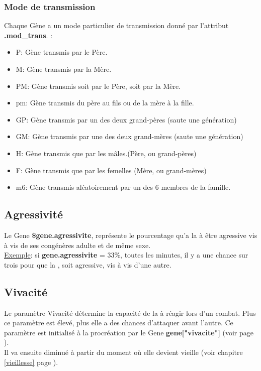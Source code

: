 \documentclass[french]{report}
\newlength{\du}\fi
\begin{document}

\newpage

\subsubsection{Mode de transmission}\label{modeTransmission}
Chaque Gène a un mode particulier de transmission donné par l'attribut \textbf{.mod\_trans}. :
\begin{itemize}
	\item P: Gène transmis par le Père.
	\item M: Gène transmis par la Mère.
	\item PM: Gène transmis soit par le Père, soit par la Mère.
	\item pm: Gène transmis du père au fils ou de la mère à la fille.
	\item GP: Gène transmis par un des deux grand-pères (saute une génération) 
	\item GM: Gène transmis par une des deux grand-mères (saute une génération)
	\item H: Gène transmis que par les mâles.(Père, ou grand-pères)
	\item F: Gène transmis que par les femelles (Mère, ou grand-mères)
	\item m6: Gène transmis aléatoirement par un des 6 membres de la famille.
\end{itemize}

\subsection{Agressivité}\label{agressivite}
Le Gene \textbf{\$gene.agressivite}, représente le pourcentage qu'a la \CoCiX à être agressive vis à vis de ses congénères adulte et de même sexe.\\
\underline{Exemple}: si \textbf{gene.agressivite} = 33\%, toutes les minutes, il y a une chance sur trois pour que la \CoCiX, soit agressive, vis à vis d'une autre.

\subsection{Vivacité}\label{vivacite}
Le paramètre Vivacité détermine la capacité de la \CoCiX à réagir lors d'un combat. Plus ce paramètre est élevé, plus elle a des chances d'attaquer avant l'autre.
Ce paramètre est initialisé à la procréation par le Gene \textbf{gene["vivacite"]} (voir page \pageref{liste_gene}).\\
Il va ensuite diminué à partir du moment où elle devient vieille (voir chapitre \ref{vieillesse} page \pageref{vieillesse}).\\
\end{document}

